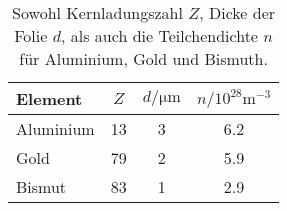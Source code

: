 \begin{table}
\centering 
   \caption{Sowohl Kernladungszahl $Z$, Dicke der Folie $d$, als auch die Teilchendichte $n$ für Aluminium, Gold und Bismuth.} 
   \label{tab:diffWQ}
    \begin{tabular}{lS[table-format=2.0]S[table-format=1.0]S[table-format=1.1]}
        \toprule
        {Element} & {$Z$} & {$d/\si{\micro\metre}$} & {$n/10^{28}\si{\metre^{-3}}$} \\
        \midrule
        {Aluminium} & 13 & 3 & 6.2  \\
        {Gold} & 79 & 2 & 5.9  \\
        {Bismut} & 83 & 1 & 2.9  \\
        \bottomrule
    \end{tabular}
\end{table}